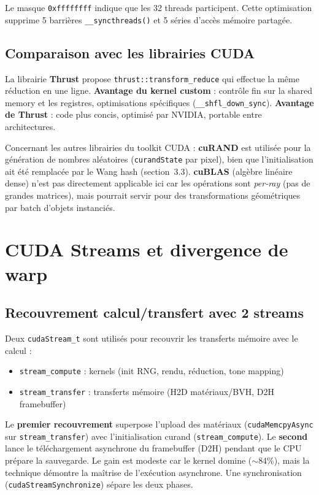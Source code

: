 \documentclass[12pt,a4paper]{article}
\begin{document}
Le masque \texttt{0xffffffff} indique que les 32 threads participent. Cette optimisation supprime 5 barrières \texttt{\_\_syncthreads()} et 5 séries d'accès mémoire partagée.

\subsection{Comparaison avec les librairies CUDA}

La librairie \textbf{Thrust} propose \texttt{thrust::transform\_reduce} qui effectue la même réduction en une ligne. \textbf{Avantage du kernel custom} : contrôle fin sur la shared memory et les registres, optimisations spécifiques (\texttt{\_\_shfl\_down\_sync}). \textbf{Avantage de Thrust} : code plus concis, optimisé par NVIDIA, portable entre architectures.

Concernant les autres librairies du toolkit CUDA : \textbf{cuRAND} est utilisée pour la génération de nombres aléatoires (\texttt{curandState} par pixel), bien que l'initialisation ait été remplacée par le Wang hash (section~3.3). \textbf{cuBLAS} (algèbre linéaire dense) n'est pas directement applicable ici car les opérations sont \textit{per-ray} (pas de grandes matrices), mais pourrait servir pour des transformations géométriques par batch d'objets instanciés.

\section{CUDA Streams et divergence de warp}

\subsection{Recouvrement calcul/transfert avec 2 streams}

Deux \texttt{cudaStream\_t} sont utilisés pour recouvrir les transferts mémoire avec le calcul :
\begin{itemize}
    \item \texttt{stream\_compute} : kernels (init RNG, rendu, réduction, tone mapping)
    \item \texttt{stream\_transfer} : transferts mémoire (H2D matériaux/BVH, D2H framebuffer)
\end{itemize}

Le \textbf{premier recouvrement} superpose l'upload des matériaux (\texttt{cudaMemcpyAsync} sur \texttt{stream\_transfer}) avec l'initialisation curand (\texttt{stream\_compute}). Le \textbf{second} lance le téléchargement asynchrone du framebuffer (D2H) pendant que le CPU prépare la sauvegarde. Le gain est modeste car le kernel domine ($\sim$84\%), mais la technique démontre la maîtrise de l'exécution asynchrone. Une synchronisation (\texttt{cudaStreamSynchronize}) sépare les deux phases.
\end{document}

